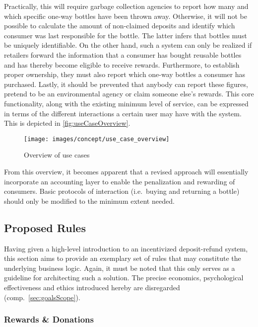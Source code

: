 Practically, this will require garbage collection agencies to report how many and which specific one-way bottles have been thrown away. Otherwise, it will not be possible to calculate the amount of non-claimed deposits and identify which consumer was last responsible for the bottle. The latter infers that bottles must be uniquely identifiable. On the other hand, such a system can only be realized if retailers forward the information that a consumer has bought reusable bottles and has thereby become eligible to receive rewards. Furthermore, to establish proper ownership, they must also report which one-way bottles a consumer has purchased. Lastly, it should be prevented that anybody can report these figures, pretend to be an environmental agency or claim someone else's rewards. This core functionality, along with the existing minimum level of service, can be expressed in terms of the different interactions a certain user may have with the system. This is depicted in \autoref{fig:useCaseOverview}.

\begin{figure}[hbt]
  \texttt{[image: images/concept/use\_case\_overview]}
  \caption{Overview of use cases}
  \label{fig:useCaseOverview}
\end{figure}

\FloatBarrier

From this overview, it becomes apparent that a revised approach will essentially incorporate an accounting layer to enable the penalization and rewarding of consumers. Basic protocols of interaction (i.e.~buying and returning a bottle) should only be modified to the minimum extent needed.

\subsection{Proposed Rules}
\label{sec:rules}
Having given a high-level introduction to an incentivized deposit-refund system, this section aims to provide an exemplary set of rules that may constitute the underlying business logic. Again, it must be noted that this only serves as a guideline for architecting such a solution. The precise economics, psychological effectiveness and ethics introduced hereby are disregarded (comp.~\ref{sec:goalsScope}).

\subsubsection{Rewards \& Donations}

